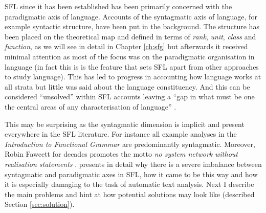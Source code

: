 


SFL since it has been established has been primarily concerned with the paradigmatic axis of language. Accounts of the syntagmatic axis of language, for example syntactic structure, have been put in the background. The structure has been placed on the theoretical map and defined in terms of \textit{rank}, \textit{unit}, \textit{class} and \textit{function}, as we will see in detail in Chapter \ref{ch:sfg} but afterwards it received minimal attention as most of the focus was on the paradigmatic organisation in language (in fact this is is the feature that sets SFL apart from other approaches to study language). This has led to progress in accounting how language works at all strata but little was said about the language constituency. And this can be considered ``unsolved'' within SFL accounts leaving a ``gap in what must be one the central areas of any characterisation of language'' \citep[25]{Bateman2008}. 


This may be surprising as the syntagmatic dimension is implicit and present everywhere in the SFL literature. For instance all example analyses in the \textit{Introduction to Functional Grammar} \citep{Halliday2013} are predominantly syntagmatic. Moreover, Robin Fawcett for decades promotes the motto \textit{no system network without realisation statements} \citep[9]{Fawcett88-good}. \citet{Bateman2008} presents in detail why there is a severe imbalance between syntagmatic and paradigmatic axes in SFL, how it came to be this way and how it is especially damaging to the task of automatic text analysis. Next I describe the main problems and hint at how potential solutions may look like (described Section \ref{sec:solution}). 

